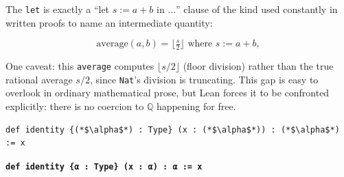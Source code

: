 \begin{mathreading}

The \texttt{let} is exactly a ``let \(s := a + b\) in \(\ldots\)'' clause of the kind used constantly in written proofs to name an intermediate quantity:

\end{mathreading}

\[
\mathrm{average}(a,b) = \big\lfloor \tfrac{s}{2} \big\rfloor
\text{ where } s := a + b,
\]

One caveat: this \texttt{average} computes \(\lfloor s/2 \rfloor\) (floor division) rather than the true rational average \(s/2\), since \texttt{Nat}'s division is truncating. This gap is easy to overlook in ordinary mathematical prose, but Lean forces it to be confronted explicitly: there is no coercion to \(\mathbb{Q}\) happening for free.

\begin{lstlisting}
def identity {(*$\alpha$*) : Type} (x : (*$\alpha$*)) : (*$\alpha$*) := x
\end{lstlisting}

\textbf{\texttt{def identity \{α : Type\} (x : α) : α := x}}

